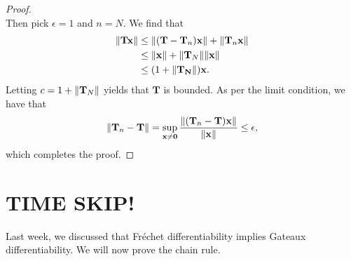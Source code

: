 \documentclass[11pt]{article}
\renewcommand{\vec}[1]{\mathbf{#1}}
\newcommand{\mat}[1]{\mathbf{#1}}
\begin{document}
\begin{adjustwidth}{0.5cm}{}
\begin{proof}
\[    \]
    Then pick $\epsilon = 1$ and $n = N$. We find that
    \begin{align*}
      \norm{\mat{T} \vec{x}} & \le \norm{(\mat{T} - \mat{T}_{n}) \vec{x}} + \norm{\mat{T}_{n} \vec{x}} \\
                             & \le \norm{\vec{x}} + \norm{\mat{T}_{N}} \norm{\vec{x}} \\
                             & \le (1 + \norm{\mat{T_{N}}}) \vec{x}.
    \end{align*}
    Letting $c = 1 + \norm{\mat{T}_{N}}$ yields that $\mat{T}$ is bounded. As per the limit condition, we have that
    \[
      \norm{\mat{T}_{n} - \mat{T}} = \sup\limits_{\vec{x} \ne \vec{0}} \frac{\norm{(\mat{T}_{n} - \mat{T}) \vec{x}}}{\norm{\vec{x}}} \le \epsilon,
    \]
    which completes the proof.
  \end{proof}
\end{adjustwidth}


\newpage

\section*{TIME SKIP!}

\newpage


Last week, we discussed that Fréchet differentiability implies Gateaux differentiability. We will now prove the chain rule.
\end{document}
